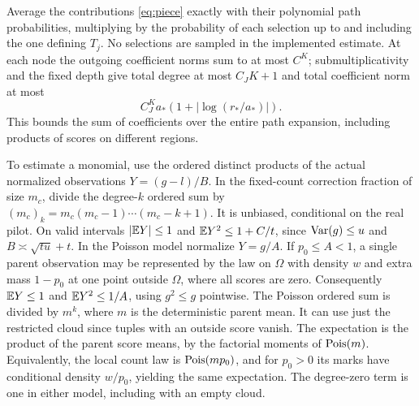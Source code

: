 Average the contributions \eqref{eq:piece} exactly with their
polynomial path probabilities, multiplying by the probability
of each selection up to and including the one defining \(T_j\).
No selections are sampled in the implemented estimate.
At each node the outgoing coefficient norms sum to at most
\(C^K\); submultiplicativity and the fixed depth give total
degree at most \(C_J K+1\) and total coefficient norm at most
\begin{equation}\label{eq:path-C}
 C_J^K a_*(1+|\log(r_*/a_*)|).
\end{equation}
This bounds the sum of coefficients over the entire path
expansion, including products of scores on different regions.

To estimate a monomial, use the ordered distinct products
of the actual normalized observations \(Y=(g-l)/B\).
In the fixed-count correction fraction of size \(m_c\), divide
the degree-\(k\) ordered sum by \((m_c)_k=m_c(m_c-1)
\cdots(m_c-k+1)\). It is unbiased, conditional on the real
pilot. On valid intervals \(|\mathbb E Y|\le1\) and
\(\mathbb E Y^2\le1+C/t\), since \(\operatorname{Var}(g)\le u\) and
\(B\asymp\sqrt{tu}+t\).
In the Poisson model normalize \(Y=g/A\).
If \(p_0\le A<1\), a single parent observation may be represented
by the law on \(\Omega\) with density \(w\) and extra mass
\(1-p_0\) at one point outside \(\Omega\), where all scores
are zero. Consequently \(\mathbb E Y\le1\) and \(\mathbb E Y^2\le1/A\),
using \(g^2\le g\) pointwise. The Poisson ordered sum is divided
by \(m^k\), where \(m\) is the deterministic parent mean.
It can use just the restricted cloud since tuples with an
outside score vanish. The expectation is the product of the
parent score means, by the factorial moments of \(\operatorname{Pois}(m)\).
Equivalently, the local count law is \(\operatorname{Pois}(m p_0)\), and for
\(p_0>0\) its marks have conditional density \(w/p_0\), yielding
the same expectation. The degree-zero term is one in either
model, including with an empty cloud.

